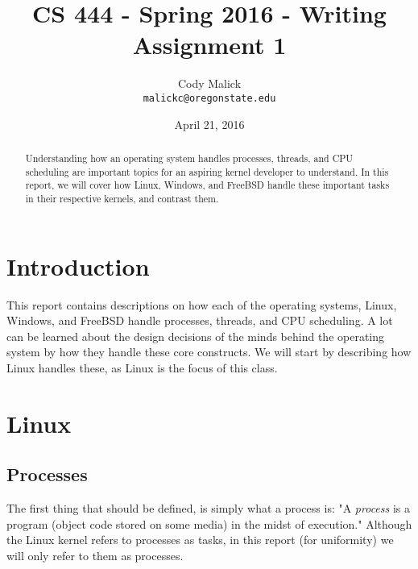 

% 
\begin{titlepage}
  \title{CS 444 - Spring 2016 - Writing Assignment 1}
  \author{Cody Malick\\
  \texttt{malickc@oregonstate.edu}}
  \date{April 21, 2016}
  \maketitle
  \vspace*{4cm}
  \begin{abstract}
      \noindent Understanding how an operating system handles processes, threads,
      and CPU scheduling are important topics for an aspiring kernel developer to
      understand. In this report, we will cover how Linux, Windows, and FreeBSD
      handle these important tasks in their respective kernels, and contrast them.
  \end{abstract}
\end{titlepage}

\tableofcontents
\clearpage
\section{Introduction}
This report contains descriptions on how each of the operating systems, Linux,
Windows, and FreeBSD handle processes, threads, and CPU scheduling. A lot can be
learned about the design decisions of the minds behind the operating system by
how they handle these core constructs. We will start by describing how Linux
handles these, as Linux is the focus of this class.

\section{Linux}
  \subsection{Processes}
The first thing that should be defined, is simply what a process is: "A
\textit{process} is a program (object code stored on some media) in the midst of
execution."\cite{robertlove2010} Although the Linux kernel refers to processes
as tasks, in this report (for uniformity) we will only refer to them as processes.

